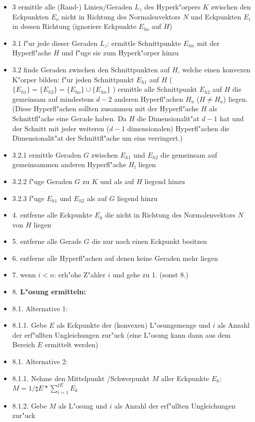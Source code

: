 \begin{itemize}
 \item [] 3 ermittle alle (Rand-) Linien/Geraden $L_z$ des Hyperk"orpers $K$ zwischen den Eckpunkten $E_o$ nicht in Richtung des Normalenvektors $N$ und Eckpunkten $E_i$ in dessen Richtung (ignoriere Eckpunkte $E_{ho}$ auf $H$)
 \item [] 3.1 f"ur jede dieser Geraden $L_z$: ermittle Schnittpunkte $E_{hn}$ mit der Hyperfl"ache $H$ und f"uge sie zum Hyperk"orper hinzu
 \item [] 3.2 finde Geraden zwischen den Schnittpunkten auf $H$, welche einen konvexen K"orper bilden: f"ur jeden Schnittpunkt $E_{h1}$ auf $H$ ( $\{E_{h1}\} = \{E_{h2}\} = \{E_{ho}\} \cup \{E_{hn}\}$ ) ermittle alle Schnittpunkt $E_{h2}$ auf $H$ die gemeinsam auf mindestens $d-2$ anderen Hyperfl"achen $H_a$ ($H \neq H_a$) liegen. (Diese Hyperfl"achen sollten zusammen mit der Hyperfl"ache $H$ als Schnittfl"ache eine Gerade haben. Da $H$ die Dimensionalit"at $d-1$ hat und der Schnitt mit jeder weiteren ($d-1$ dimensionalen) Hyperfl"achen die Dimensionalit"at der Schnittfl"ache um eins verringert.)
 \item [] 3.2.1 ermittle Geraden $G$ zwischen $E_{h1}$ und $E_{h2}$ die gemeinsam auf gemeinsammen anderen Hyperfl"ache $H_l$ liegen
 \item [] 3.2.2 f"uge Geraden $G$ zu $K$ und als auf $H$ liegend hinzu
 \item [] 3.2.3 f"uge $E_{h1}$ und $E_{h2}$ als auf $G$ liegend hinzu
 \item [] 4. entferne alle Eckpunkte $E_k$ die nicht in Richtung des Normalenvektors $N$ von $H$ liegen
 \item [] 5. entferne alle Gerade $G$ die nur noch einen Eckpunkt besitzen
 \item [] 6. entferne alle Hyperfl"achen auf denen keine Geraden mehr liegen
 \item [] 7. wenn $i < n$: erh"ohe Z"ahler $i$ und gehe zu 1. (sonst 8.)
 \item [] 8. \textbf{L"osung ermitteln:}
 \item [] 8.1. Alternative 1:
 \item [] 8.1.1. Gebe $E$ als Eckpunkte der (konvexen) L"osungsmenge und $i$ als Anzahl der erf"ullten Ungleichungen zur"uck (eine L"osung kann dann aus dem Bereich $E$ ermittelt werden)
 \item [] 8.1. Alternative 2:
 \item [] 8.1.1. Nehme den Mittelpunkt /Schwerpunkt $M$ aller Eckpunkte $E_k$: $M = 1 / \sharp E * \sum_{i=1}^{\sharp E} E_k$
 \item [] 8.1.2. Gebe $M$ als L"osung und $i$ als Anzahl der erf"ullten Ungleichungen zur"uck
\end{itemize}



